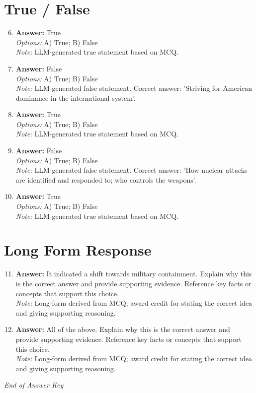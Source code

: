 \documentclass[12pt]{article}
\begin{document}
\section*{True / False}
\begin{enumerate}[label=\arabic*.]
\setcounter{enumi}{5}
\item \textbf{Answer:} True
\\ \textit{Options:} A) True; B) False
\\ \textit{Note:} LLM-generated true statement based on MCQ.
\item \textbf{Answer:} False
\\ \textit{Options:} A) True; B) False
\\ \textit{Note:} LLM-generated false statement. Correct answer: 'Striving for American dominance in the international system'.
\item \textbf{Answer:} True
\\ \textit{Options:} A) True; B) False
\\ \textit{Note:} LLM-generated true statement based on MCQ.
\item \textbf{Answer:} False
\\ \textit{Options:} A) True; B) False
\\ \textit{Note:} LLM-generated false statement. Correct answer: 'How nuclear attacks are identified and responded to; who controls the weapons'.
\item \textbf{Answer:} True
\\ \textit{Options:} A) True; B) False
\\ \textit{Note:} LLM-generated true statement based on MCQ.
\end{enumerate}

\section*{Long Form Response}
\begin{enumerate}[label=\arabic*.]
\setcounter{enumi}{10}
\item \textbf{Answer:} It indicated a shift towards military containment. Explain why this is the correct answer and provide supporting evidence. Reference key facts or concepts that support this choice.
\\ \textit{Note:} Long-form derived from MCQ; award credit for stating the correct idea and giving supporting reasoning.
\item \textbf{Answer:} All of the above. Explain why this is the correct answer and provide supporting evidence. Reference key facts or concepts that support this choice.
\\ \textit{Note:} Long-form derived from MCQ; award credit for stating the correct idea and giving supporting reasoning.
\end{enumerate}

\vfill
\noindent\textit{End of Answer Key}
\end{document}

